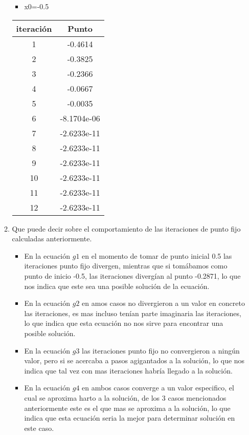 \documentclass{udpreport}
\begin{document}
\begin{enumerate}
\begin{enumerate}
\begin{table}[H]
\begin{tabular} { |c|c|}
        \end{tabular}
        
    \end{table}
     \begin{itemize}
\item x0=-0.5
\end{itemize}
\begin{table}[H]
    \centering
        \begin{tabular} { |c|c|}
        \hline
        iteración  &  Punto\\
        \hline
        1 &  -0.4614      \\
         \hline
        2 &   -0.3825   \\
         \hline
        3 &  -0.2366 \\
         \hline
        4 &  -0.0667    \\
         \hline
        5 &   -0.0035 \\
         \hline
        6 & -8.1704e-06     \\
         \hline
        7 &     -2.6233e-11 \\
         \hline
        8 &   -2.6233e-11   \\
         \hline
        9 &        -2.6233e-11 \\
         \hline
        10 &     -2.6233e-11    \\
         \hline
        11 &    -2.6233e-11 \\
         \hline
        12 &    -2.6233e-11  \\
        \hline
        \end{tabular}
    \end{table}
    
\item Que puede decir sobre el comportamiento de las iteraciones de punto fijo calculadas anteriormente.
\begin{itemize}

\item En la ecuación $g1$ en el momento de tomar de punto inicial 0.5 las iteraciones punto fijo divergen, mientras que si tomábamos como punto de inicio -0.5, las iteraciones divergían al punto -0.2871, lo que nos indica que este sea una posible solución de la ecuación.
\item En la ecuación $g2$ en amos casos no divergieron a un valor en concreto las iteraciones, es mas incluso tenían parte imaginaria las iteraciones, lo que indica que esta ecuación no nos sirve para encontrar una posible solución.
\item En la ecuación $g3$ las iteraciones punto fijo no convergieron a ningún valor, pero si se acercaba a pasos agigantados a la solución, lo que nos indica que tal vez con mas iteraciones habría llegado a la solución.
\item En la ecuación $g4$ en ambos casos converge a un valor especifico, el cual se aproxima harto a la solución, de los 3 casos mencionados anteriormente este es el que mas se aproxima a la solución, lo que indica que esta ecuación seria la mejor para determinar solución en este caso.
\end{itemize}



\end{enumerate}
\end{enumerate}
\end{document}
